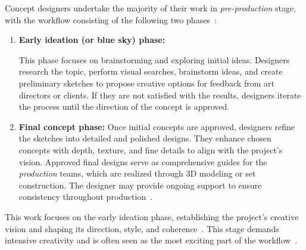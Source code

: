Concept designers undertake the majority of their work in \textit{pre-production} stage, with the workflow consisting of the following two phases~\cite{conceptart2018, bigbadWorld2015, randomguidebook2023, iterationandreference2023}:
\begin{enumerate}
    \item \textbf{Early ideation (or blue sky) phase:} 

    This phase focuses on brainstorming and exploring initial ideas. Designers research the topic, perform visual searches, brainstorm ideas, and create preliminary sketches to propose creative options for feedback from art directors or clients. If they are not satisfied with the results, designers iterate the process until the direction of the concept is approved.

    \item \textbf{Final concept phase:} Once initial concepts are approved, designers refine the sketches into detailed and polished designs. They enhance chosen concepts with depth, texture, and fine details to align with the project's vision. Approved final designs serve as comprehensive guides for the \textit{production} teams, which are realized through 3D modeling or set construction. The designer may provide ongoing support to ensure consistency throughout production~\cite{levelup2014}.
\end{enumerate}

This work focuses on the early ideation phase, establishing the project's creative vision and shaping its direction, style, and coherence~\cite{80lv2020,adobe2020,randomguidebook2023}. This stage demands intensive creativity and is often seen as the most exciting part of the workflow~\cite{iterationandreference2023,rassa2018concept}. 

